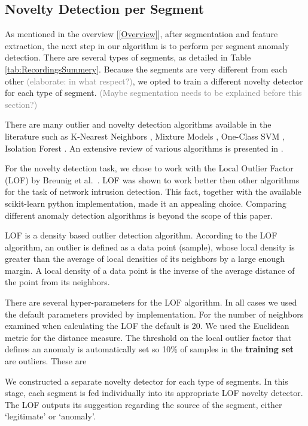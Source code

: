 \documentclass[conference]{IEEEtran}
\begin{document}
\subsection{Novelty Detection per Segment}
  As mentioned in the overview [\ref{Overview}], after segmentation and feature  extraction, the next step in our algorithm is to perform per segment anomaly  detection. There are several types of segments, as detailed in Table \ref{tab:RecordingsSummery}. Because the segments are very different from each other \textcolor{gray}{(elaborate: in what respect?)}, we opted to train a different novelty detector for each type of segment.
  \textcolor{gray}{(Maybe segmentation needs to be explained before this section?)}
  
  There are many outlier and novelty detection algorithms available in the literature such as K-Nearest Neighbors \cite{hautamaki2004outlier}, Mixture Models \cite{}, One-Class SVM \cite{}, Isolation Forest \cite{liu2008isolation}. An extensive review of various algorithms is presented in \cite{pimentel2014review}.
  
  For the novelty detection task, we chose to work with the Local Outlier Factor (LOF) by Breunig et al.\ \cite{breunig2000lof}. LOF was shown to work better then other algorithms for the task of network intrusion detection\cite{lazarevic2003comparative}. This fact, together with the available scikit-learn \cite{scikit-learn} python implementation, made it an appealing choice. Comparing different anomaly detection algorithms is beyond the scope of this paper.
  
  LOF is a density based outlier detection algorithm. According to the LOF algorithm, an outlier is defined as a data point (sample), whose local density is greater than the average of local densities of its neighbors by a large enough margin. A local density of a data point is the inverse of the average distance of the point from its neighbors.
  
  There are several hyper-parameters for the LOF algorithm. In all cases we used the default parameters provided by implementation. For the number of neighbors examined when calculating the LOF the default is 20. We used the Euclidean metric for the distance measure. The threshold on the local outlier factor that defines an anomaly is automatically set so 10\% of samples in the \textbf{training set} are outliers. These are 
  
  We constructed a separate novelty detector for each type of segments.
  In this stage, each segment is fed individually into its appropriate LOF novelty detector. The LOF outputs its suggestion regarding the source of the segment, either `legitimate' or `anomaly'.
  
\end{document}
